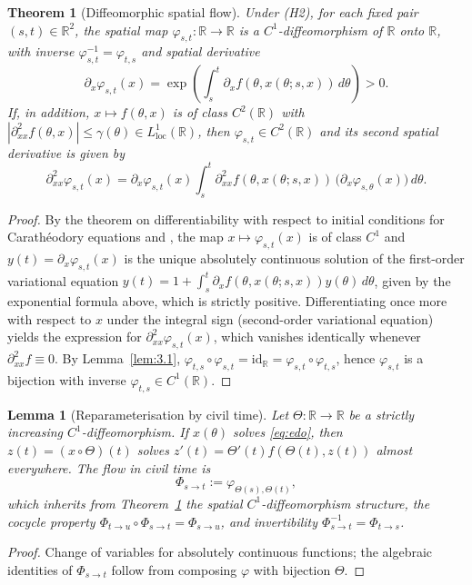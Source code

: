 \documentclass[11pt, a4paper]{article}
\theoremstyle{definition}
\theoremstyle{plain}
\newtheorem{teorema}[definicao]{Theorem}
\newtheorem{lema}[definicao]{Lemma}
\theoremstyle{remark}
\begin{document}
\begin{teorema}[Diffeomorphic spatial flow]\label{teo:3.2}
Under (H2), for each fixed pair $(s, t) \in \mathbb{R}^2$, the spatial map $\varphi_{s,t} : \mathbb{R} \to \mathbb{R}$ is a $C^1$-diffeomorphism of $\mathbb{R}$ onto $\mathbb{R}$, with inverse $\varphi_{s,t}^{-1} = \varphi_{t,s}$ and spatial derivative
\[
\partial_x \varphi_{s,t}(x) = \exp\left(\int_s^t \partial_x f(\theta, x(\theta; s, x))\,d\theta\right) > 0.
\]
If, in addition, $x \mapsto f(\theta, x)$ is of class $C^2(\mathbb{R})$ with $|\partial_{xx}^2 f(\theta, x)| \le \gamma(\theta) \in L^1_{\text{loc}}(\mathbb{R})$, then $\varphi_{s,t} \in C^2(\mathbb{R})$ and its second spatial derivative is given by
\[
\partial_{xx}^2 \varphi_{s,t}(x) = \partial_x \varphi_{s,t}(x) \int_s^t \partial_{xx}^2 f(\theta, x(\theta; s, x))\,\big(\partial_x \varphi_{s,\theta}(x)\big)\,d\theta.
\]
\end{teorema}
\begin{proof}
By the theorem on differentiability with respect to initial conditions for Carathéodory equations \cite[Chap.~2, Thm.~4.1]{CoddingtonLevinson1955} and \cite[Chap.~V]{Hartman2002}, the map $x \mapsto \varphi_{s,t}(x)$ is of class $C^1$ and $y(t) = \partial_x \varphi_{s,t}(x)$ is the unique absolutely continuous solution of the first-order variational equation $y(t) = 1 + \int_s^t \partial_x f(\theta, x(\theta; s, x))y(\theta)\,d\theta$, given by the exponential formula above, which is strictly positive. Differentiating once more with respect to $x$ under the integral sign (second-order variational equation) yields the expression for $\partial_{xx}^2 \varphi_{s,t}(x)$, which vanishes identically whenever $\partial_{xx}^2 f \equiv 0$. By Lemma~\ref{lem:3.1}, $\varphi_{t,s} \circ \varphi_{s,t} = \mathrm{id}_{\mathbb{R}} = \varphi_{s,t} \circ \varphi_{t,s}$, hence $\varphi_{s,t}$ is a bijection with inverse $\varphi_{t,s} \in C^1(\mathbb{R})$.
\end{proof}

\begin{lema}[Reparameterisation by civil time]\label{lem:3.3}
Let $\Theta : \mathbb{R} \to \mathbb{R}$ be a strictly increasing $C^1$-diffeomorphism. If $x(\theta)$ solves \eqref{eq:edo}, then $z(t) = (x \circ \Theta)(t)$ solves $z'(t) = \Theta'(t) f(\Theta(t), z(t))$ almost everywhere. The flow in civil time is
\[
\Phi_{s \to t} := \varphi_{\Theta(s), \Theta(t)},
\]
which inherits from Theorem~\ref{teo:3.2} the spatial $C^1$-diffeomorphism structure, the cocycle property $\Phi_{t \to u} \circ \Phi_{s \to t} = \Phi_{s \to u}$, and invertibility $\Phi_{s \to t}^{-1} = \Phi_{t \to s}$.
\end{lema}
\begin{proof}
Change of variables for absolutely continuous functions; the algebraic identities of $\Phi_{s \to t}$ follow from composing $\varphi$ with bijection $\Theta$.
\end{proof}
\end{document}
